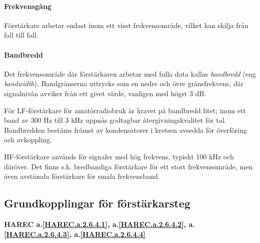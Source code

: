 \paragraph{Frekvensgång}
Förstärkare arbetar endast inom ett visst frekvensområde, vilket kan
skilja från fall till fall.

\paragraph{Bandbredd}
Det frekvensområde där förstärkaren arbetar med fulla data kallas
\emph{bandbredd} (eng \emph{bandwidth}). Bandgränserna uttrycks som en nedre
och övre gränsfrekvens, där signalnivån avviker från ett givet värde, vanligen
med högst 3 dB.

För LF-förstärkare för amatörradiobruk är kravet på bandbredd litet;
inom ett band av 300 Hz till 3 kHz uppnås godtagbar
återgivningskvalitet för tal. Bandbredden bestäms främst av
kondensatorer i kretsen avsedda för överföring och avkoppling.

HF-förstärkare används för signaler med hög frekvens, typiskt 100 kHz
och däröver.  Det finns s.k. bredbandiga förstärkare för ett stort
frekvensområde, men även avstämda förstärkare för smala frekvensband.

\subsection{Grundkopplingar för förstärkarsteg}
\textbf{HAREC a.\ref{HAREC.a.2.6.4.1}, a.\ref{HAREC.a.2.6.4.2}, a.\ref{HAREC.a.2.6.4.3}, a.\ref{HAREC.a.2.6.4.4}\label{myHAREC.a.2.6.4.1}\label{myHAREC.a.2.6.4.2}\label{myHAREC.a.2.6.4.3}\label{myHAREC.a.2.6.4.4}}

